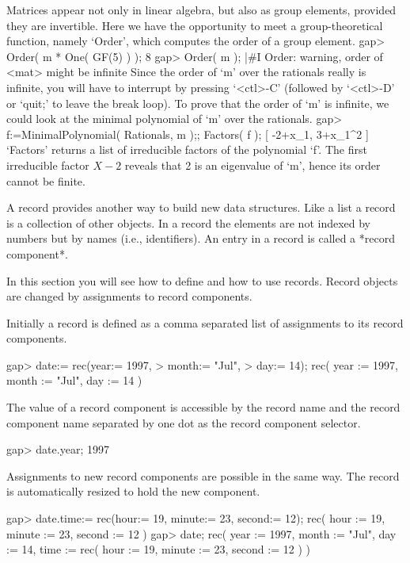 Matrices appear not only in linear algebra, but also as group elements,
provided they are invertible.
Here we have the opportunity to meet a group-theoretical function,
namely `Order', which computes the order of a group element.
\begintt
    gap> Order( m * One( GF(5) ) );
    8
    gap> Order( m );
    |#I  Order: warning, order of <mat> might be infinite
\endtt
Since the order  of `m' over the  rationals really is  infinite, you will
have to interrupt {\GAP} by  pressing `<ctl>-C' (followed by `<ctl>-D' or
`quit;'  to leave the   break loop). To prove  that  the order of `m'  is
infinite,  we  could look  at  the  minimal  polynomial  of `m'  over the
rationals.
\beginexample
    gap> f:=MinimalPolynomial( Rationals, m );; Factors( f );
    [ -2+x_1, 3+x_1^2 ]
\endexample
`Factors'  returns a list of  irreducible factors  of the polynomial `f'.
The first  irreducible factor $X-2$ reveals   that 2 is an  eigenvalue of
`m', hence its order cannot be finite.



A record provides another way to  build new data structures.  Like a list
a record is a collection of other  objects.  In a record the elements are
not indexed by numbers but by  names (i.e., identifiers).   An entry in a
record is called a *record component*.

In  this section  you  will see how to  define  and how to  use
records.  Record objects are changed by assignments to record components.

Initially a record is defined as a comma separated list of assignments to
its record components.

\beginexample
    gap> date:= rec(year:= 1997,
    >               month:= "Jul",
    >               day:= 14);
    rec(
      year := 1997,
      month := "Jul",
      day := 14 )
\endexample

The value of a record component is accessible by  the record name and the
record  component name separated   by one dot   as  the record  component
selector.

\beginexample
    gap> date.year;
    1997
\endexample

Assignments to new record components  are possible in  the same way.  The
record is automatically resized to hold the new component.

\beginexample
    gap> date.time:= rec(hour:= 19, minute:= 23, second:= 12);
    rec(
      hour := 19,
      minute := 23,
      second := 12 )
    gap> date;
    rec(
      year := 1997,
      month := "Jul",
      day := 14,
      time := rec(
          hour := 19,
          minute := 23,
          second := 12 ) )
\endexample

